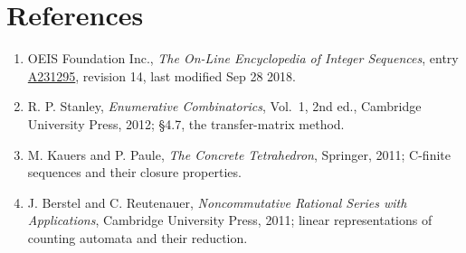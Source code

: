 \documentclass[11pt]{article}
\theoremstyle{definition}
\begin{document}
\section{References}

\begin{enumerate}

\item OEIS Foundation Inc., \emph{The On-Line Encyclopedia of Integer Sequences}, entry \href{https://oeis.org/A231295}{A231295}, revision 14, last modified Sep 28 2018.

\item R. P. Stanley, \emph{Enumerative Combinatorics}, Vol.~1, 2nd ed., Cambridge University Press, 2012; \S4.7, the transfer-matrix method.

\item M. Kauers and P. Paule, \emph{The Concrete Tetrahedron}, Springer, 2011; C-finite sequences and their closure properties.

\item J. Berstel and C. Reutenauer, \emph{Noncommutative Rational Series with Applications}, Cambridge University Press, 2011; linear representations of counting automata and their reduction.

\end{enumerate}
\end{document}
